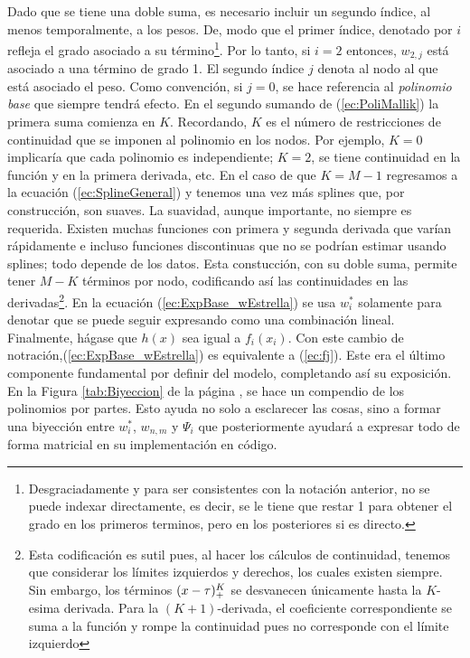\documentclass[../Main/Main.tex]{subfiles}
\begin{document}
Dado que se tiene una doble suma, es necesario incluir un segundo índice, al menos temporalmente, a los pesos. De, modo que el primer índice, denotado por $i$ refleja el grado asociado a su término\footnote{Desgraciadamente y para ser consistentes con la notación anterior, no se puede indexar directamente, es decir, se le tiene que restar 1 para obtener el grado en los primeros terminos, pero en los posteriores si es directo.}. Por lo tanto, si $i = 2$ entonces, $w_{2,j}$ está asociado a una término de grado 1. El segundo índice $j$ denota al nodo al que está asociado el peso. Como convención, si $j = 0$, se hace referencia al \textit{polinomio base} que siempre tendrá efecto. En el segundo sumando de (\ref{ec:PoliMallik}) la primera suma comienza en $K$. Recordando, $K$ es el número de restricciones de continuidad que se imponen al polinomio en los nodos. Por ejemplo, $K = 0$ implicaría que cada polinomio es independiente; $K = 2$, se tiene continuidad en la función y en la primera derivada, etc. En el caso de que $K = M-1$ regresamos a la ecuación (\ref{ec:SplineGeneral}) y tenemos una vez más splines que, por construcción, son suaves. La suavidad, aunque importante, no siempre es requerida. Existen muchas funciones con primera y segunda derivada que varían rápidamente e incluso funciones discontinuas que no se podrían estimar usando splines; todo depende de los datos. Esta constucción, con su doble suma, permite tener $M-K$ términos por nodo, codificando así las continuidades en las derivadas\footnote{Esta codificación es sutil pues, al hacer los cálculos de continuidad, tenemos que considerar los límites izquierdos y derechos, los cuales existen siempre. Sin embargo, los términos $(x-\tau)^K_+$ se desvanecen únicamente hasta la $K$-esima derivada. Para la $(K+1)$-derivada, el coeficiente correspondiente se suma a la función y rompe la continuidad pues no corresponde con el límite izquierdo}. En la ecuación (\ref{ec:ExpBase_wEstrella}) se usa $w_i^*$ solamente para denotar que se puede seguir expresando como una combinación lineal. Finalmente, hágase que $h(x)$ sea igual a $f_i(x_i)$. Con este cambio de notración,(\ref{ec:ExpBase_wEstrella}) es equivalente a (\ref{ec:fj}). Este era el último componente fundamental por definir del modelo, completando así su exposición.\\

En la Figura \ref{tab:Biyeccion} de la página \pageref{tab:Biyeccion}, se hace un compendio de los polinomios por partes. Esto ayuda no solo a esclarecer las cosas, sino a formar una biyección entre $w_i^*$, $w_{n,m}$ y $\Psi_i$ que posteriormente ayudará a expresar todo de forma matricial en su implementación en código.
\end{document}
